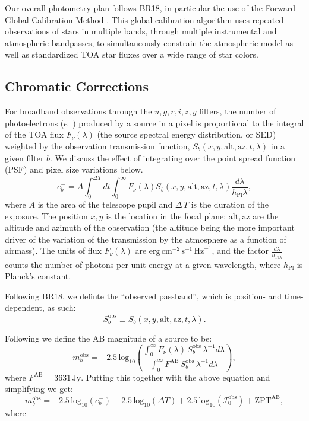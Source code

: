 \documentclass[SE,authoryear,lsstdraft,toc]{lsstdoc}
\newcommand{\etron}{e^{-}}
\newcommand{\mobs}{m_b^{\mathrm{obs}}}
\newcommand{\Sobs}{S_b^{\mathrm{obs}}}
\newcommand{\Iobs}{\mathcal{I}_0^{\mathrm{obs}}}
\begin{document}
Our overall photometry plan follows BR18, in particular the use of the Forward Global Calibration Method \citep[FGCM;][]{2018AJ....155...41B}.
This global calibration algorithm uses repeated observations of stars in multiple bands, through multiple instrumental and atmospheric bandpasses, to simultaneously constrain the atmospheric model as well as standardized TOA star fluxes over a wide range of star colors.

\subsection{Chromatic Corrections}

For broadband observations through the ${u,g,r,i,z,y}$ filters, the number of
photoelectrons ($\etron$) produced by a source in a pixel is proportional to the
integral of the TOA flux $F_\nu(\lambda)$ (the source spectral energy
distribution, or SED) weighted by the observation
transmission function, $S_b(x, y, \mathrm{alt}, \mathrm{az}, t, \lambda)$ in a
given filter $b$.  We discuss the effect of integrating over the point spread
function (PSF) and pixel size variations below.
%
\begin{equation}
\etron_b = A \int_0^{\Delta T}dt \int_0^\infty
F_\nu(\lambda) S_b(x, y, \mathrm{alt}, \mathrm{az}, t, \lambda)
\frac{d\lambda}{h_{\mathrm{Pl}}\lambda},
\end{equation}
%
where $A$ is the area of the telescope pupil and $\Delta\,T$ is the duration of
the exposure.  The position ${x, y}$ is the location in the focal plane;
${\mathrm{alt}, \mathrm{az}}$ are the altitude and azimuth of the observation
(the altitude being the more important driver of the variation of the
transmission by the atmosphere as a function of airmass).  The units of flux
$F_\nu(\lambda)$ are
$\mathrm{erg}\,\mathrm{cm}^{-2}\,\mathrm{s}^{-1}\,\mathrm{Hz}^{-1}$, and the
factor $\frac{d\lambda}{h_{\mathrm{Pl}\lambda}}$ counts the number of photons
per unit energy at a given wavelength, where $h_{\mathrm{Pl}}$ is Planck's
constant.

Following BR18, we definte the ``observed passband'', which is position- and
time-dependent, as such:
%
\begin{equation}
\Sobs \equiv S_b(x, y, \mathrm{alt}, \mathrm{az}, t, \lambda).
\end{equation}

Following \citet{1996AJ....111.1748F} we define the AB magnitude of a source to be:
%
\begin{equation}
\mobs = -2.5\,\mathrm{log}_{10} \left ( \frac{\int_0^{\infty}
  F_\nu(\lambda)\,\Sobs\,\lambda^{-1}d\lambda}{\int_0^{\infty}
  F^{\mathrm{AB}}\,\Sobs\,\lambda^{-1}d\lambda} \right ),
\end{equation}
%
where $F^{\mathrm{AB}} = 3631\,\mathrm{Jy}$.  Putting this together with the
above equation and simplifying we get:
%
\begin{equation}
\mobs = -2.5\,\mathrm{log}_{10}(\etron_b) +
2.5\,\mathrm{log}_{10}({\Delta}T) + 2.5\,\mathrm{log}_{10}(\Iobs) +
\mathrm{ZPT}^{\mathrm{AB}},
\end{equation}
%
where
\end{document}
